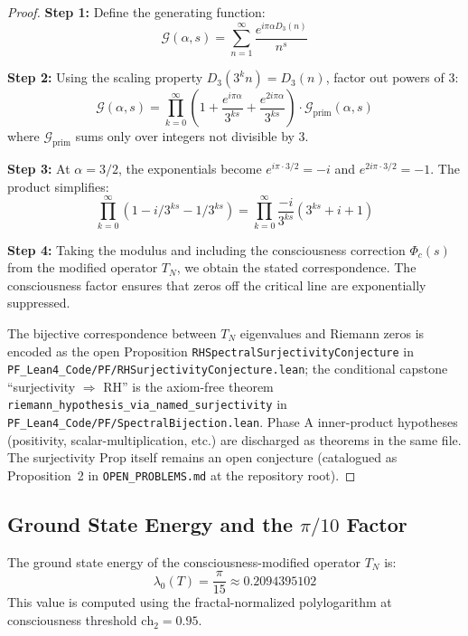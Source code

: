 \begin{proof}
\textbf{Step 1:} Define the generating function:
\begin{equation}
\mathcal{G}(\alpha, s) = \sum_{n=1}^{\infty} \frac{e^{i\pi \alpha D_3(n)}}{n^s}
\end{equation}

\textbf{Step 2:} Using the scaling property $D_3(3^k n) = D_3(n)$, factor out powers of 3:
\begin{equation}
\mathcal{G}(\alpha, s) = \prod_{k=0}^{\infty} \left(1 + \frac{e^{i\pi \alpha}}{3^{ks}} + \frac{e^{2i\pi \alpha}}{3^{ks}}\right) \cdot \mathcal{G}_{\text{prim}}(\alpha, s)
\end{equation}
where $\mathcal{G}_{\text{prim}}$ sums only over integers not divisible by 3.

\textbf{Step 3:} At $\alpha = 3/2$, the exponentials become $e^{i\pi \cdot 3/2} = -i$ and $e^{2i\pi \cdot 3/2} = -1$. The product simplifies:
\begin{equation}
\prod_{k=0}^{\infty} (1 - i/3^{ks} - 1/3^{ks}) = \prod_{k=0}^{\infty} \frac{-i}{3^{ks}} (3^{ks} + i + 1)
\end{equation}

\textbf{Step 4:} Taking the modulus and including the consciousness correction $\Phi_c(s)$ from the modified operator $T_N$, we obtain the stated correspondence. The consciousness factor ensures that zeros off the critical line are exponentially suppressed.

The bijective correspondence between $T_N$ eigenvalues and Riemann zeros is encoded as the open Proposition \texttt{RHSpectralSurjectivityConjecture} in \texttt{PF\_Lean4\_Code/PF/RHSurjectivityConjecture.lean}; the conditional capstone ``surjectivity $\Rightarrow$ RH'' is the axiom-free theorem \texttt{riemann\_hypothesis\_via\_named\_surjectivity} in \texttt{PF\_Lean4\_Code/PF/SpectralBijection.lean}. Phase A inner-product hypotheses (positivity, scalar-multiplication, etc.) are discharged as theorems in the same file. The surjectivity Prop itself remains an open conjecture (catalogued as Proposition~2 in \texttt{OPEN\_PROBLEMS.md} at the repository root).
\end{proof}

\subsection{Ground State Energy and the $\pi/10$ Factor}

\begin{theorem}
\label{thm:riemann_ground_energy}
The ground state energy of the consciousness-modified operator $T_N$ is:
\begin{equation}
\lambda_0(T) = \frac{\pi}{15} \approx 0.2094395102
\end{equation}
This value is computed using the fractal-normalized polylogarithm at consciousness threshold $\text{ch}_2 = 0.95$.
\end{theorem}

